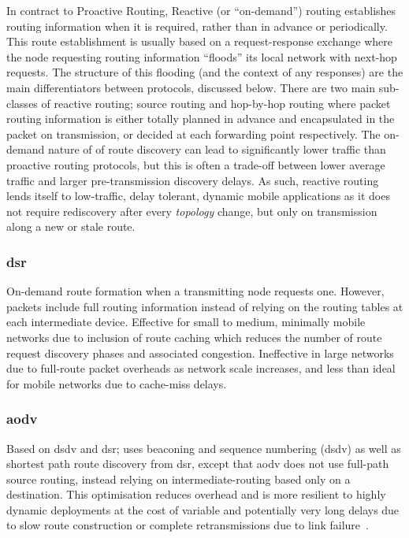 {In contract to Proactive Routing, Reactive (or ``on-demand'') routing establishes routing information when it is required, rather than in advance or periodically.
This route establishment is usually based on a request-response exchange where the node requesting routing information ``floods'' its local network with next-hop requests.
The structure of this flooding (and the context of any responses) are the main differentiators between protocols, discussed below.
There are two main sub-classes of reactive routing; source routing and hop-by-hop routing where packet routing information is either totally planned in advance and encapsulated in the packet on transmission, or decided at each forwarding point respectively.
The on-demand nature of of route discovery can lead to significantly lower traffic than proactive routing protocols, but this is often a trade-off between lower average traffic and larger pre-transmission discovery delays. 
As such, reactive routing lends itself to low-traffic, delay tolerant, dynamic mobile applications as it does not require rediscovery after every \emph{topology} change, but only on transmission along a new or stale route.

\subsubsection{\gls{dsr}}
On-demand route formation when a transmitting node requests one. However, packets include full routing information instead of relying on the routing tables at each intermediate device\cite{Johnson1996}. Effective for small to medium, minimally mobile networks due to inclusion of route caching which reduces the number of route request discovery phases and associated congestion. Ineffective in large networks due to full-route packet overheads as network scale increases, and less than ideal for mobile networks due to cache-miss delays.

\subsubsection{\gls{aodv}}
Based on \gls{dsdv} and \gls{dsr}; uses beaconing and sequence numbering (\gls{dsdv}) as well as shortest path route discovery from \gls{dsr}, except that \gls{aodv} does not use full-path source routing, instead relying on intermediate-routing based only on a destination. This optimisation reduces overhead and is more resilient to highly dynamic deployments at the cost of variable and potentially very long delays due to slow route construction or complete retransmissions due to link failure~\cite{Rai2010a}. 

}
